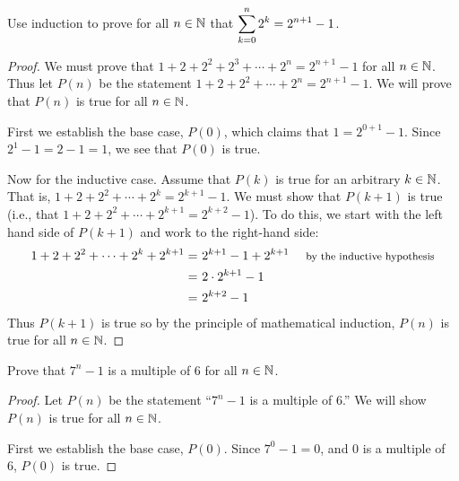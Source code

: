 \begin{questions}

\question Use induction to prove for all $n \in \mathbb N$ that $\displaystyle\sum_{k=0}^n 2^k = 2^{n+1} - 1$.

	\begin{answer}
		\begin{proof}
		 We must prove that $1 + 2 + 2^2 + 2^3 + \cdots +2^n = 2^{n+1} - 1$ for all $n \in \mathbb N$.  Thus let $P(n)$ be the statement $1 + 2 + 2^2 + \cdots + 2^n = 2^{n+1} - 1$.  We will prove that $P(n)$ is true for all $n \in \mathbb N$.
		 
		 First we establish the base case, $P(0)$, which claims that $1 = 2^{0+1} -1$.  Since $2^1 - 1 = 2 - 1 = 1$, we see that $P(0)$ is true.
		 
		 Now for the inductive case.  Assume that $P(k)$ is true for an arbitrary $k \in \mathbb N$.  That is, $1 + 2 + 2^2 + \cdots + 2^k = 2^{k+1} - 1$.  We must show that $P(k+1)$ is true (i.e., that $1 + 2 + 2^2 + \cdots + 2^{k+1} = 2^{k+2} - 1$).  To do this, we start with the left hand side of $P(k+1)$ and work to the right-hand side:
		 \begin{align*}
		  1 + 2 + 2^2 + \cdots + 2^k + 2^{k+1} = &~ 2^{k+1} - 1 + 2^{k+1} & \mbox{ \footnotesize by the inductive hypothesis}\\
		   = & ~2\cdot 2^{k+1} - 1 & \\
		   = &~ 2^{k+2} - 1 &
		 \end{align*}
		Thus $P(k+1)$ is true so by the principle of mathematical induction, $P(n)$ is true for all $n \in \mathbb N$.
		\end{proof}
	\end{answer}
	
	
	
	
\question Prove that $7^n - 1$ is a multiple of 6 for all $n \in \mathbb N$.

	\begin{answer}
		\begin{proof}
		 Let $P(n)$ be the statement ``$7^n - 1$ is a multiple of 6.''  We will show $P(n)$ is true for all $n \in \mathbb N$.  
		 
		 First we establish the base case, $P(0)$.  Since $7^0 - 1 = 0$, and $0$ is a multiple of 6, $P(0)$ is true.
		 

\end{proof}
\end{answer}
\end{questions}
